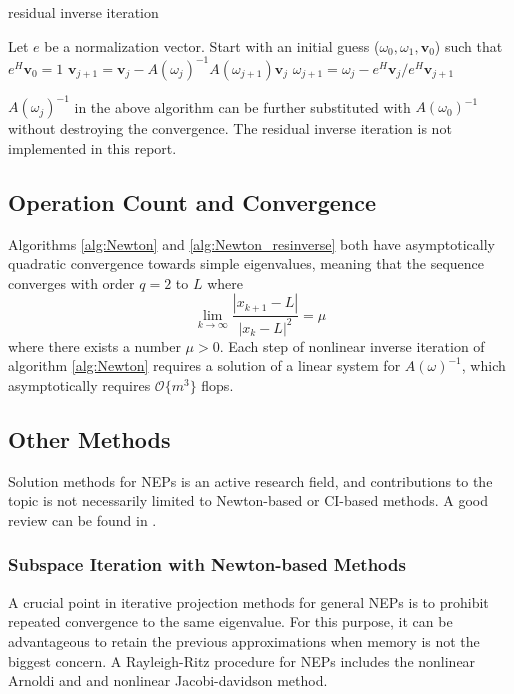 \documentclass[11pt,letterpaper]{article}
\begin{document}
\begin{algorithm}
\caption{residual inverse iteration}
\label{alg:Newton_resinverse}
\begin{algorithmic}
\STATE Let $e$ be a normalization vector. Start with an initial guess ($\omega_0, \omega_1, \mathbf{v}_0$) such that $e^{H}\mathbf{v}_0=1$ 
\STATE $\mathbf{v}_{j+1} = \mathbf{v}_j- A(\omega_j)^{-1} A(\omega_{j+1})\mathbf{v}_j $
\STATE $\omega_{j+1} = \omega_j - e^H\mathbf{v}_j/e^H\mathbf{v}_{j+1} $
\ENDFOR
\end{algorithmic}
\end{algorithm}
$A(\omega_j)^{-1}$ in the above algorithm can be further substituted with $A(\omega_0)^{-1}$ without destroying the convergence. The residual inverse iteration is not implemented in this report. 

\subsection{Operation Count and Convergence}
Algorithms \ref{alg:Newton} and \ref{alg:Newton_resinverse} both 
have asymptotically quadratic convergence towards simple eigenvalues, meaning that the sequence converges with order $q=2$ to $L$ where 
\begin{equation}\label{eq:quadconv}
    \lim_{k \to \infty} \frac{|x_{k+1}-L|}{|x_k-L|^{2}} = \mu 
\end{equation}
where there exists a number $\mu>0$. Each step of nonlinear inverse iteration of algorithm \ref{alg:Newton} requires a solution of a linear system for $A(\omega)^{-1}$, which asymptotically requires $\mathcal{O}\{m^3\}$ flops. 

\subsection{Other Methods}
Solution methods for NEPs is an active research field, and contributions to the topic is not necessarily limited to Newton-based or CI-based methods. A good review can be found in \citep{effenberger_robust_2013}. 
\subsubsection{Subspace Iteration with Newton-based Methods}
A crucial point in iterative projection methods for general NEPs is to  prohibit repeated convergence to  the same eigenvalue. For this purpose, it can be advantageous to retain the previous approximations when memory is not the biggest concern. A Rayleigh-Ritz procedure for NEPs includes the nonlinear Arnoldi and \citep{voss2004arnoldi} and nonlinear Jacobi-davidson \citep{mehrmann2004nonlinear, voss2007jacobi} method. 
\end{document}
